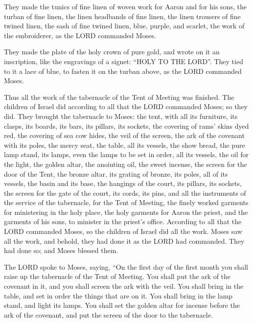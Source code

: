 \myverse{}They made the tunics of fine linen of woven work for Aaron and
for his sons,
\myverse{}the turban of fine linen, the linen headbands of fine linen, the linen trousers
of fine twined linen,
\myverse{}the sash of fine twined linen, blue, purple, and scarlet, the work of the
embroiderer, as the LORD commanded Moses.


\myverse{}They made the plate of the holy crown of pure gold, and wrote
on it an inscription, like the engravings of a signet: “HOLY TO THE LORD”.
\myverse{}They tied to it a lace of blue, to fasten it on the turban above, as the
LORD commanded Moses.


\myverse{}Thus all the work of the tabernacle of the Tent of Meeting was
finished. The children of Israel did according to all that the LORD commanded Moses; so they did.
\myverse{}They brought the tabernacle to Moses: the tent, with all its furniture, its
clasps, its boards, its bars, its pillars, its sockets,
\myverse{}the covering of rams’ skins dyed red, the covering of sea cow hides, the
veil of the screen,
\myverse{}the ark of the covenant with its poles, the mercy seat,
\myverse{}the table, all its vessels, the show bread,
\myverse{}the pure lamp stand, its lamps, even the lamps to be set in order, all its
vessels, the oil for the light,
\myverse{}the golden altar, the anointing oil, the sweet incense, the screen for the
door of the Tent,
\myverse{}the bronze altar, its grating of bronze, its poles, all of its vessels, the
basin and its base,
\myverse{}the hangings of the court, its pillars, its sockets, the screen for the gate
of the court, its cords, its pins, and all the instruments of the service of the tabernacle, for the Tent
of Meeting,
\myverse{}the finely worked garments for ministering in the holy place, the holy garments
for Aaron the priest, and the garments of his sons, to minister in the priest’s office.
\myverse{}According to all that the LORD commanded Moses, so the children of Israel
did all the work.
\myverse{}Moses saw all the work, and behold, they had done it as the LORD had commanded.
They had done so; and Moses blessed them.


\mychapter{} \myverse*{}The LORD spoke to Moses, saying,
\myverse{}“On the first day of the first month you shall raise up the tabernacle of the
Tent of Meeting.
\myverse{}You shall put the ark of the covenant in it, and you shall screen the ark with
the veil.
\myverse{}You shall bring in the table, and set in order the things that are on it. You
shall bring in the lamp stand, and light its lamps.
\myverse{}You shall set the golden altar for incense before the ark of the covenant,
and put the screen of the door to the tabernacle.


